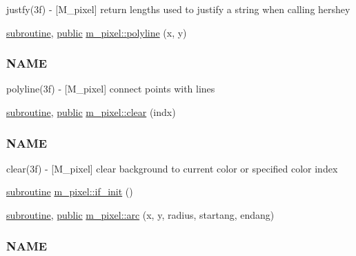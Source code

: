 \begin{DoxyCompactItemize}
\begin{DoxyCompactList}
justfy(3f) -\/ \mbox{[}M\+\_\+pixel\mbox{]} return lengths used to justify a string when calling hershey \end{DoxyCompactList}\item 
\hyperlink{M__stopwatch_83_8txt_acfbcff50169d691ff02d4a123ed70482}{subroutine}, \hyperlink{M__stopwatch_83_8txt_a2f74811300c361e53b430611a7d1769f}{public} \hyperlink{namespacem__pixel_a067e896f50047694a52c30cffa6f502f}{m\+\_\+pixel\+::polyline} (x, y)
\begin{DoxyCompactList}\small\item\em \subsubsection*{N\+A\+ME}

polyline(3f) -\/ \mbox{[}M\+\_\+pixel\mbox{]} connect points with lines \end{DoxyCompactList}\item 
\hyperlink{M__stopwatch_83_8txt_acfbcff50169d691ff02d4a123ed70482}{subroutine}, \hyperlink{M__stopwatch_83_8txt_a2f74811300c361e53b430611a7d1769f}{public} \hyperlink{namespacem__pixel_af3b81a21a0b2f6b5eddd09c031bd6173}{m\+\_\+pixel\+::clear} (indx)
\begin{DoxyCompactList}\small\item\em \subsubsection*{N\+A\+ME}

clear(3f) -\/ \mbox{[}M\+\_\+pixel\mbox{]} clear background to current color or specified color index \end{DoxyCompactList}\item 
\hyperlink{M__stopwatch_83_8txt_acfbcff50169d691ff02d4a123ed70482}{subroutine} \hyperlink{namespacem__pixel_a6c23c2779e54da4ac7505cfb816cc2b1}{m\+\_\+pixel\+::if\+\_\+init} ()
\item 
\hyperlink{M__stopwatch_83_8txt_acfbcff50169d691ff02d4a123ed70482}{subroutine}, \hyperlink{M__stopwatch_83_8txt_a2f74811300c361e53b430611a7d1769f}{public} \hyperlink{namespacem__pixel_ab881b9c2adff081a086cd83a1f1341fb}{m\+\_\+pixel\+::arc} (x, y, radius, startang, endang)
\begin{DoxyCompactList}\small\item\em \subsubsection*{N\+A\+ME}


\end{DoxyCompactList}
\end{DoxyCompactItemize}
